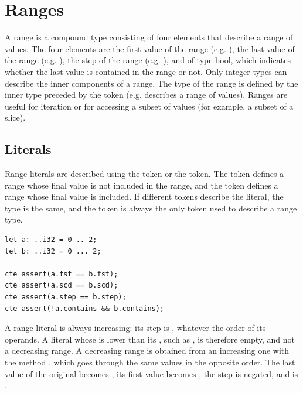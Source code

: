 \section{Ranges}%
\label{sec:compound:range_type}

A range is a compound type consisting of four elements that describe a range of
values. The four elements are  the first value of the range (e.g.
),  the last value of the range (e.g. ),
 the step of the range (e.g. ), and  of
type bool, which indicates whether the last value  is contained in
the range or not. Only integer types can describe the inner components of a
range. The type of the
range is defined by the inner type preceded by the token  (e.g.
 describes a range of  values). Ranges are useful for
iteration or for accessing a subset of values (for example, a subset of a
slice).

\subsection{Literals}

Range literals are described using the  token or the 
token. The  token defines a range whose final value is not
included in the range, and the  token defines a range whose final
value is included. If different tokens describe the literal, the
type is the same, and the  token is always the only token used to
describe a range type.

\begin{lstlisting}[style=coloredverbatim]
let a: ..i32 = 0 .. 2;
let b: ..i32 = 0 ... 2;

cte assert(a.fst == b.fst);
cte assert(a.scd == b.scd);
cte assert(a.step == b.step);
cte assert(!a.contains && b.contains);
\end{lstlisting}

A range literal is always increasing: its step is , whatever the
order of its operands. A literal whose  is lower than its
, such as , is therefore empty, and not a decreasing
range. A decreasing range is obtained from an increasing one with the method
, which goes through the same values in the opposite order. The
last value of the original becomes , its first value becomes
, the step is negated, and  is .

